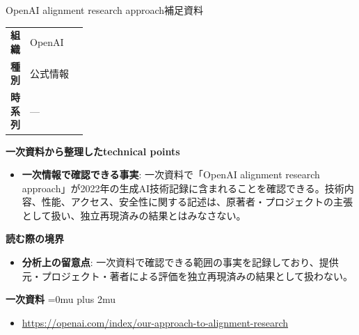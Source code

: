 \begin{technicalnote}{OpenAI alignment research approach}{補足資料}
\begingroup
\begin{tabularx}{\linewidth}{@{}>{\bfseries}p{0.22\linewidth}X@{}}
組織 & OpenAI \\
種別 & 公式情報 \\
時系列 & — \\
\end{tabularx}
\smallskip
{\bfseries 一次資料から整理したtechnical points}
\begin{itemize}[leftmargin=1.5em,itemsep=0.35em]
\item \textbf{一次情報で確認できる事実}: 一次資料で「OpenAI alignment research approach」が2022年の生成AI技術記録に含まれることを確認できる。技術内容、性能、アクセス、安全性に関する記述は、原著者・プロジェクトの主張として扱い、独立再現済みの結果とはみなさない。
\end{itemize}
\begin{minipage}{\linewidth}
{\bfseries 読む際の境界}
\begin{itemize}[leftmargin=1.5em,itemsep=0.35em]
\item \textbf{分析上の留意点}: 一次資料で確認できる範囲の事実を記録しており、提供元・プロジェクト・著者による評価を独立再現済みの結果として扱わない。
\end{itemize}
\begin{samepage}
{\bfseries 一次資料}
\begingroup\sloppy
\Urlmuskip=0mu plus 2mu\relax
\begin{itemize}[leftmargin=1.5em,itemsep=0.25em]
\item {\scriptsize\url{https://openai.com/index/our-approach-to-alignment-research}}
\end{itemize}
\endgroup
\end{samepage}
\end{minipage}
\endgroup
\end{technicalnote}
\medskip

